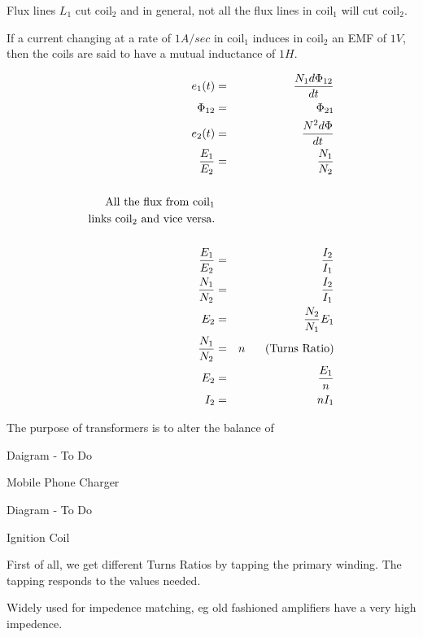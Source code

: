 \documentclass[a4paper,12pt]{article}
\begin{document}
Flux lines $L_{1}$ cut coil$_2$ and in general, not all the flux lines
in coil$_1$ will cut coil$_2$.

If a current changing at a rate of $1 A/sec$ in coil$_1$ induces in
coil$_2$ an EMF of $1V$, then the coils are said to have a mutual
inductance of $1H$.

\begin{eqnarray*}
e_{1}(t) & = & \frac{N_{1} d \Phi_{12}}{dt} \\
\Phi_{12} & = & \Phi_{21} \\
e_{2}(t) & = & \frac{N^{2} d \Phi}{dt} \\
\frac{E_{1}}{E_{2}} & = & \frac{N_{1}}{N_{2}} \\
& & \\
\mbox{All the flux from coil$_1$} \\
\mbox{links coil$_2$ and vice versa.} \\
& & \\
\frac{E_{1}}{E_{2}} & = & \frac{I_{2}}{I_{1}} \\
\frac{N_{1}}{N_{2}} & = & \frac{I_{2}}{I_{1}} \\
E_{2} & = & \frac{N_{2}}{N_{1}} E_{1} \\
\frac{N_{1}}{N_{2}} & = & n \mbox{\hspace{5mm} (Turns Ratio)} \\
E_{2} & = & \frac{E_{1}}{n} \\
I_{2} & = & n I_{1}
\end{eqnarray*}

The purpose of transformers is to alter the balance of %

\begin{table}[hbtp]

Daigram - To Do

\end{table}

Mobile Phone Charger

\begin{table}[hbtp]

Diagram - To Do

\end{table}

Ignition Coil

\vspace{10mm}

First of all, we get different Turns Ratios by tapping the primary
winding. The tapping responds to the values needed.

Widely used for impedence matching, eg old fashioned amplifiers have a
very high impedence.
\end{document}
